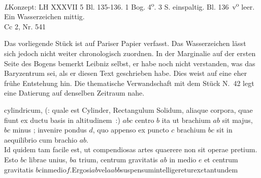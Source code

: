 \begin{Ueberlieferung}%
{\textit{L}}Konzept: LH XXXVII 5 Bl. 135-136. 1 Bog. 4\textsuperscript{o}. 3 S. einspaltig. Bl. 136~v\textsuperscript{o} leer. Ein
Wasserzeichen mittig. \\%
Cc 2, Nr. 541
\end{Ueberlieferung}
%
\begin{Datierungsgruende}%
Das vorliegende Stück ist auf Pariser Papier verfasst.
Das Wasserzeichen lässt sich jedoch nicht weiter chronologisch zuordnen.
In der Marginalie auf der ersten Seite des Bogens bemerkt Leibniz selbst,
er habe noch nicht verstanden, was das Baryzentrum sei,
als er diesen Text geschrieben habe.
Dies weist auf eine eher frühe Entstehung hin.
Die thematische Verwandschaft mit dem Stück N.~42
legt eine Datierung auf denselben Zeitraum nahe.
\end{Datierungsgruende}
%
\pstartfirst%
\noindent%
[135~r\textsuperscript{o}] 
 cylindricum, (: quale est Cylinder, Rectangulum Solidum, aliaque corpora,
quae fiunt ex ductu basis in altitudinem~:)  $abc$  centro $b$ ita ut brachium\protect{} $ab$ sit majus, $bc$ minus ; invenire pondus\protect{} $d$, quo appenso ex puncto $c$ brachium\protect{} $bc$ sit in aequilibrio\protect{} cum brachio $ab$.\\
\indent Id quidem tam facile est, ut compendiosas artes quaerere non sit operae pretium. 
\pend
\pstart
Esto $bc$ librae\protect{} unius, $ba$ trium, centrum  gravitatis\protect{} $ab$ in medio $e$ et centrum gravitatis\protect{} $bc$\hfill in\hfill medio\hfill $f$.\hfill Ergo\hfill si\hfill $ab$\hfill vel\hfill  $aabb$\hfill suspensum\hfill intelligeretur\hfill ex\hfill $e$\hfill {}\hfill tantundem
